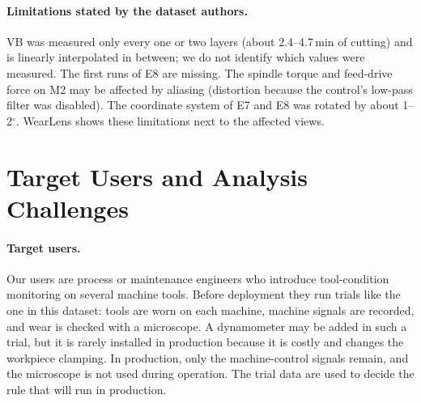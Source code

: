 \paragraph{Limitations stated by the dataset authors.}
VB was measured only every one or two layers (about 2.4--4.7\,min of cutting) and is linearly interpolated
in between; we do not identify which values were measured. The first runs of E8 are missing. The spindle
torque and feed-drive force on M2 may be affected by aliasing (distortion because the control's low-pass
filter was disabled). The coordinate system of E7 and E8 was rotated by about 1--2$^\circ$. WearLens shows
these limitations next to the affected views.

\section{Target Users and Analysis Challenges}
\label{sec:users}
\paragraph{Target users.}
Our users are process or maintenance engineers who introduce tool-condition monitoring on several
machine tools. Before deployment they run trials like the one in this dataset: tools are worn on each machine,
machine signals are recorded, and wear is checked with a microscope. A dynamometer may be added in such
a trial, but it is rarely installed in production because it is costly and changes the workpiece clamping.
In production, only the machine-control signals remain, and the microscope is not used during operation.
The trial data are used to decide the rule that will run in production.

